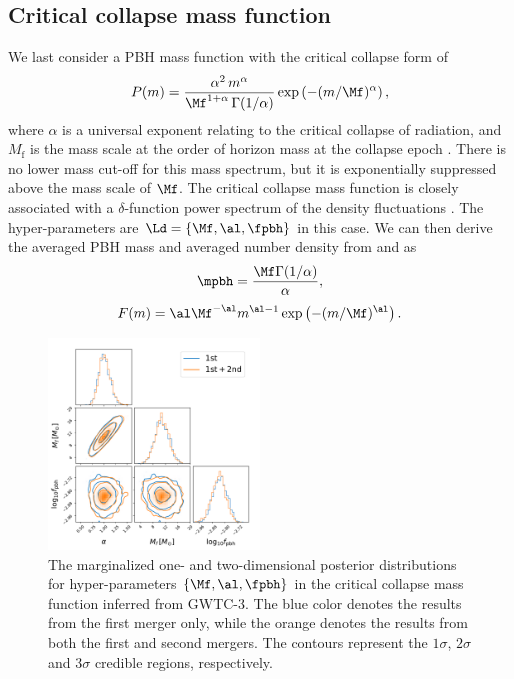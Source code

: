 \documentclass[
reprint,           %
superscriptaddress,%
amsmath,           %
amssymb,           %
aps,               %
prd,               %
notitlepage,       %
longbibliography,  %
floatfix,          %
nofootinbib,
]{revtex4-1}
\def\({\left(}
\def\){\right)}
\def\e{\begin{equation}}
\def\q{\end{equation}}
\begin{document}
\subsection{Critical collapse mass function}


We last consider a PBH mass function with the critical collapse form \cite{Niemeyer:1997mt,Yokoyama:1998xd,Carr:2016hva,Gow:2020cou} of
\e
P(m)=\frac{\alpha^2\,  m^\alpha}{\Mf^{1+\alpha}\, \Gamma(1 / \alpha)} \exp \left(-(m/\Mf)^{\alpha}\right),
\q
where $\alpha$ is a universal exponent relating to the critical collapse of radiation, and $M_{\mathrm{f}}$ is the mass scale at the order of horizon mass at the collapse epoch \cite{Carr:2016hva}. 
There is no lower mass cut-off for this mass spectrum, but it is exponentially suppressed above the mass scale of $\Mf$.
The critical collapse mass function is closely associated with a $\delta$-function power spectrum of the density fluctuations \cite{Niemeyer:1997mt,Yokoyama:1998xd,Carr:2016hva,Gow:2020cou}. 
The hyper-parameters are $\Ld = \{\Mf, \al, \fpbh\}$ in this case. 
We can then derive the averaged PBH mass and averaged number density from  and  as
\e
\mpbh = \frac{\Mf \Gamma(1 / \alpha)}{\alpha},
\q
\e 
F(m) = \al \Mf^{-\al} m^{\al -1} \exp\(-(m/\Mf)^{\al}\).
\q

\begin{figure}[tbp!]
	\centering
	\includegraphics[width=0.5\textwidth]{post-CC.pdf}
	\caption{\label{posterior-CC}The marginalized one- and two-dimensional posterior distributions for hyper-parameters $\{\Mf, \al, \fpbh\}$ in the critical collapse mass function inferred from GWTC-3. The blue color denotes the results from the first merger only, while the orange denotes the results from both the first and second mergers. The contours represent the $1\sigma$, $2\sigma$ and $3\sigma$ credible regions, respectively.}
\end{figure}
\end{document}
